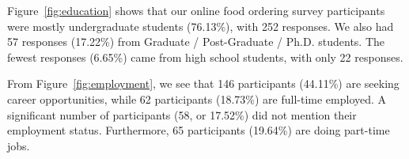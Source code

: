 \documentclass[a4paper,fleqn]{cas-sc}
\begin{document}
Figure~\ref{fig:education} shows that our online food ordering survey participants were mostly undergraduate students (76.13\%), with 252 responses. We also had 57 responses (17.22\%) from Graduate / Post-Graduate / Ph.D. students. The fewest responses (6.65\%) came from high school students, with only 22 responses.


From Figure~\ref{fig:employment}, we see that 146 participants (44.11\%) are seeking career opportunities, while 62 participants (18.73\%) are full-time employed. A significant number of participants (58, or 17.52\%) did not mention their employment status. Furthermore, 65 participants (19.64\%) are doing part-time jobs.

\end{document}

